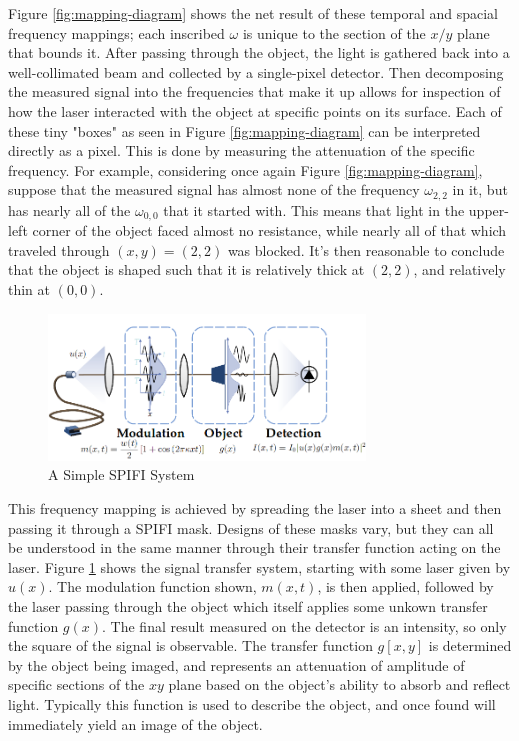 \documentclass[12pt]{article}
\begin{document}
Figure \ref{fig:mapping-diagram} shows the net result of these temporal and spacial frequency mappings;
each inscribed $\omega$ is unique to the section of the
$x/y$ plane that bounds it. After passing through the object, the light is gathered back into a well-collimated beam and collected by a single-pixel detector. Then decomposing the measured signal into the frequencies that make it up allows for inspection of how the laser interacted with the object at specific points on its surface. Each of these tiny "boxes" as seen in Figure \ref{fig:mapping-diagram} can be interpreted directly as a pixel. This is done by measuring the attenuation of the specific frequency. For example, considering once again Figure \ref{fig:mapping-diagram}, suppose that the measured signal has almost none of the frequency $\omega_{2,2}$ in it, but has nearly all of the $\omega_{0,0}$ that it started with. This means that light in the upper-left corner of the object faced almost no resistance, while nearly all of that which traveled through $(x,y)=(2,2)$ was blocked. It's then reasonable to conclude that the object is shaped such that it is relatively thick at $(2,2)$, and relatively thin at $(0,0)$.


\begin{figure}[ht]
\centering
\includegraphics[width=0.75\textwidth]{spifi-system-graphical}
\caption{A Simple SPIFI System\label{fig:spifi-sys}}
\end{figure}

This frequency mapping is achieved by spreading the laser into a sheet and then passing it through a SPIFI mask. Designs of these masks vary, but they can all be understood in the same manner through their transfer function acting on the laser. Figure
\ref{fig:spifi-sys} shows the signal transfer system, starting with some laser given by $u(x)$. The modulation function shown, $m(x,t)$, is then applied, followed by the laser passing through the object which itself applies some unkown transfer function $g(x)$. The final result measured on the detector is an intensity, so only the square of the signal is observable.
The transfer function $g[x,y]$ is determined
by the object being
imaged, and represents an attenuation of amplitude of specific sections of the
$xy$ plane based on the object's ability to absorb and reflect light.
Typically this function is used to describe the object, and once found will immediately yield an image of the object.
\end{document}
